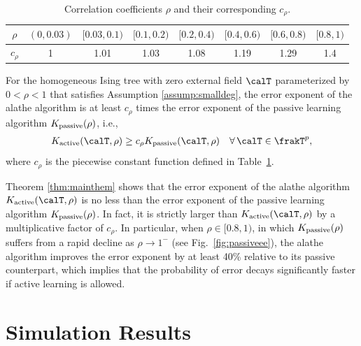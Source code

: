 \documentclass[11pt,onecolumn]{article}
\newcommand{\Passive}{{\rm passive}}
\newcommand{\Active}{{\rm active}}
\begin{document}
\begin{table}[t]
	\normalsize
	\centering
	\begin{tabular}{|c|c|c|c|c|c|c|c|}
	\hline
	$\rho$ & $(0,0.03)$ & $[0.03,0.1)$ & $[0.1,0.2)$ & $[0.2,0.4)$ & $[0.4,0.6)$ & $[0.6,0.8)$ & $[0.8,1)$\\
	\hline
	$c_{\rho}$ & 1 & 1.01 & 1.03 & 1.08 & 1.19& 1.29 & 1.4 \\
	\hline
	\end{tabular}
	\caption{Correlation coefficients $\rho$ and their corresponding $c_{\rho}$.}
	\label{table:crho}
\end{table}

\begin{theorem}\label{thm:mainthem}
	For the homogeneous Ising tree with zero external field $\calT$ parameterized by $0<\rho<1$ that satisfies Assumption \ref{assump:smalldeg}, the error exponent of the \ac{alathe} algorithm is at least $c_{\rho}$ times the 
	error exponent of the passive learning algorithm $K _{\Passive}(\rho)$, i.e.,
	\begin{align}
		K _{\Active}(\calT,\rho)\geq c_{\rho}K _{\Passive}(\calT,\rho) \quad \forall\, \calT\in\frakT^{p},
	\end{align}
	where $c_{\rho}$ is the piecewise constant function   defined in Table~\ref{table:crho}.
\end{theorem} 
Theorem \ref{thm:mainthem} shows that the error exponent of the \ac{alathe} algorithm $K _{\Active}(\calT,\rho)$ is no less than the error exponent of the passive learning algorithm $K _{\Passive}(\rho)$. In fact, it is strictly larger than $K _{\Active}(\calT,\rho)$ by a multiplicative factor of $c_{\rho}$. In particular, when 
$\rho\in[0.8,1)$, in which $K _{\Passive}(\rho)$ suffers from a rapid decline as $\rho\to 1^-$ (see Fig.~\ref{fig:passiveee}), the \ac{alathe} algorithm improves the error exponent by at least 40\% relative to  its passive counterpart, which implies that the probability of error decays significantly faster if active learning is allowed. 

\section{Simulation Results} \label{sec:sim}
\end{document}

